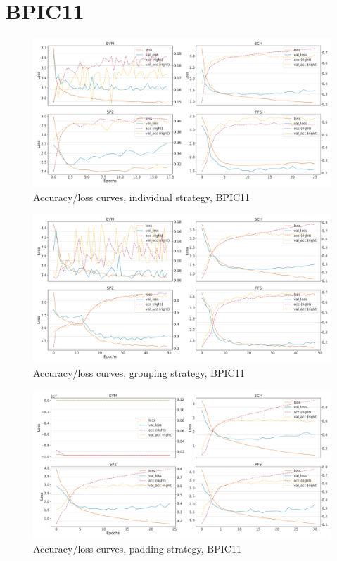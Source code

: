\section*{BPIC11}
\begin{figure}[!htb]
    \centering
    \includegraphics[width=\textwidth]{gfx/bpic2011/individual_loss_acc_curve.pdf}
    \caption{Accuracy/loss curves, individual strategy, BPIC11}
\end{figure}
\begin{figure}[!htb]
    \centering
    \includegraphics[width=\textwidth]{gfx/bpic2011/grouped_loss_acc_curve.pdf}
    \caption{Accuracy/loss curves, grouping strategy, BPIC11}
\end{figure}
\begin{figure}[!htb]
    \centering
    \includegraphics[width=\textwidth]{gfx/bpic2011/padded_loss_acc_curve.pdf}
    \caption{Accuracy/loss curves, padding strategy, BPIC11}
\end{figure}
